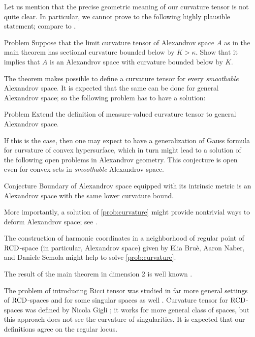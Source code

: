 Let us mention that the precise geometric meaning of our curvature tensor is not quite clear. 
In particular, we cannot prove to the following highly plausible statement; compare to \cite[Conjecture~1.1]{G}.

\begin{thm}{Problem}
Suppose that the limit curvature tensor of Alexandrov space $A$ as in the main theorem has sectional curvature bounded below by $K>\kappa$.
Show that it implies that $A$ is an Alexandrov space with curvature bounded below by $K$.
\end{thm}

The theorem makes possible to define a curvature tensor for every \emph{smoothable} Alexandrov space.
It is expected that the same can be done for general Alexandrov space; so the following problem has to have a solution:

\begin{thm}{Problem}\label{prob:curvature}
Extend the definition of measure-valued curvature tensor to general Alexandrov space.
\end{thm}

If this is the case, then one may expect to have a generalization of Gauss formula for curvature of convex hypersurface, which in turn might lead to a solution of the following open problems in Alexandrov geometry.
This conjecture is open even for convex sets in \emph{smoothable} Alexandrov space.

\begin{thm}{Conjecture}
Boundary of Alexandrov space equipped with its intrinsic metric is an Alexandrov space with the same lower curvature bound.
\end{thm}

More importantly, a solution of \ref{prob:curvature} might provide nontrivial ways to deform Alexandrov space; see \cite[Section 9]{petrunin-conc}. 

The construction of harmonic coordinates in a neighborhood of regular point of $\operatorname{RCD}$-space (in particular, Alexandrov space) given by Elia Bruè, Aaron Naber, and Daniele Semola \cite{BNS} might help to solve \ref{prob:curvature}.

The result of the main theorem in dimension 2 is well known \cite[VII \S13]{AZ}.

The problem of introducing Ricci tensor
was studied in far more general settings of 
 $\operatorname{RCD}$-spaces \cite{G1,St,H}
 and
for some singular  spaces as well \cite{L}.
Curvature tensor for  $\operatorname{RCD}$-spaces was defined by Nicola Gigli \cite{G};
it works for more general class of spaces, but this approach does not see the curvature of singularities.
It is expected that our definitions agree on the regular locus.

